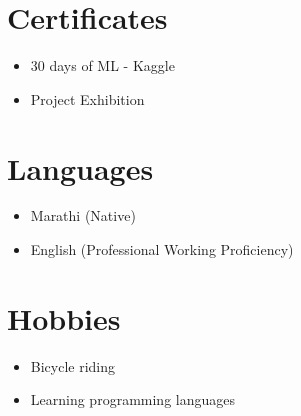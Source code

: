 \documentclass[letterpaper,11pt]{article}
\begin{document}
\section*{Certificates}
\begin{multicols}{2}
\begin{itemize}[leftmargin=*]
    \item 30 days of ML - Kaggle
    \item Project Exhibition
\end{itemize}
\end{multicols}

\section*{Languages}
\begin{multicols}{2}
\begin{itemize}[leftmargin=*]
    \item Marathi (Native)
    \item English (Professional Working Proficiency)
\end{itemize}
\end{multicols}

\section*{Hobbies}
\begin{multicols}{2}
\begin{itemize}[leftmargin=*]
    \item Bicycle riding
    \item Learning programming languages
\end{itemize}
\end{multicols}
\end{document}
